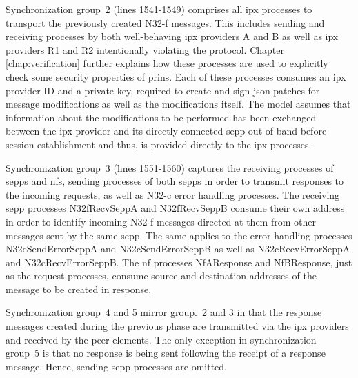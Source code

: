 Synchronization group~2 (lines 1541-1549) comprises all \gls{ipx} processes to transport the previously created N32-f messages.
This includes sending and receiving processes by both well-behaving \gls{ipx} providers A and B as well as \gls{ipx} providers R1 and R2 intentionally violating the protocol.
Chapter \ref{chap:verification} further explains how these processes are used to explicitly check some security properties of \gls{prins}.
Each of these processes consumes an \gls{ipx} provider ID and a private key, required to create and sign \gls{json} patches for message modifications as well as the modifications itself.
The model assumes that information about the modifications to be performed has been exchanged between the \gls{ipx} provider and its directly connected \gls{sepp} out of band before session establishment and thus, is provided directly to the \gls{ipx} processes.

Synchronization group~3 (lines 1551-1560) captures the receiving processes of \glspl{sepp} and \glspl{nf}, sending processes of both \glspl{sepp} in order to transmit responses to the incoming requests, as well as N32-c error handling processes.
The receiving \gls{sepp} processes {\sffamily N32fRecvSeppA} and {\sffamily N32fRecvSeppB} consume their own address in order to identify incoming N32-f messages directed at them from other messages sent by the same \gls{sepp}.
The same applies to the error handling processes {\sffamily N32cSendErrorSeppA} and {\sffamily N32cSendErrorSeppB} as well as {\sffamily N32cRecvErrorSeppA} and {\sffamily N32cRecvErrorSeppB}.
The \gls{nf} processes {\sffamily NfAResponse} and {\sffamily NfBResponse}, just as the request processes, consume source and destination addresses of the message to be created in response.

Synchronization group~4 and 5 mirror group.~2 and 3 in that the response messages created during the previous phase are transmitted via the \gls{ipx} providers and received by the peer elements.
The only exception in synchronization group~5 is that no response is being sent following the receipt of a response message. Hence, sending \gls{sepp} processes are omitted.


